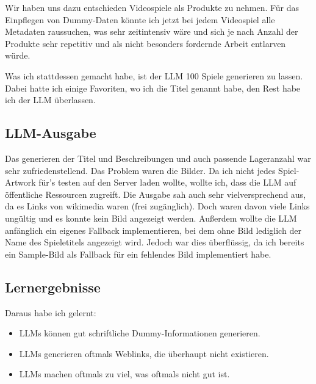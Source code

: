 \documentclass[12pt, a4paper]{scrreprt}
\begin{document}
	Wir haben uns dazu entschieden Videospiele als Produkte zu nehmen. Für das Einpflegen von Dummy-Daten könnte ich jetzt bei jedem Videospiel alle Metadaten raussuchen, was sehr zeitintensiv wäre und sich je nach Anzahl der Produkte sehr repetitiv und als nicht besonders fordernde Arbeit entlarven würde.
	
	Was ich stattdessen gemacht habe, ist der LLM 100 Spiele generieren zu lassen. Dabei hatte ich einige Favoriten, wo ich die Titel genannt habe, den Rest habe ich der LLM überlassen.
	
	\subsection{LLM-Ausgabe}
	
	Das generieren der Titel und Beschreibungen und auch passende Lageranzahl war sehr zufriedenstellend. Das Problem waren die Bilder. Da ich nicht jedes Spiel-Artwork für's testen auf den Server laden wollte, wollte ich, dass die LLM auf öffentliche Ressourcen zugreift. Die Ausgabe sah auch sehr vielversprechend aus, da es Links von wikimedia waren (frei zugänglich). Doch waren davon viele Links ungültig und es konnte kein Bild angezeigt werden. Außerdem wollte die LLM anfänglich ein eigenes Fallback implementieren, bei dem ohne Bild lediglich der Name des Spieletitels angezeigt wird. Jedoch war dies überflüssig, da ich bereits ein Sample-Bild als Fallback für ein fehlendes Bild implementiert habe.
	 		
	\subsection{Lernergebnisse}

	Daraus habe ich gelernt:

	\begin{itemize}
		\item 	LLMs können gut schriftliche Dummy-Informationen generieren.
		\item 	LLMs generieren oftmals Weblinks, die überhaupt nicht existieren. 
		\item   LLMs machen oftmals zu viel, was oftmals nicht gut ist. 
	\end{itemize}
	
\end{document}
